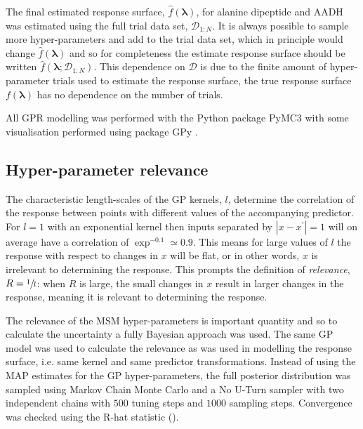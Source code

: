 The final estimated response surface, $\hat{f}(\mathbf{\lambda})$, for alanine dipeptide and AADH was estimated using the full trial data set, $\mathcal{D}_{1:N}$. It is always possible to sample more hyper-parameters and add to the trial data set, which in principle would change $\hat{f}(\mathbf{\lambda})$ and so for completeness the estimate response surface should be written $\hat{f}(\mathbf{\lambda}; \mathcal{D}_{1:N})$. This dependence on $\mathcal{D}$ is due to the finite amount of hyper-parameter trials used to estimate the response surface, the true response surface $f(\mathbf{\lambda})$ has no dependence on the number of trials. 

All GPR modelling was performed with the Python package PyMC3 \cite{salvatierProbabilisticProgrammingPython2016} with some visualisation performed using package GPy \cite{gpy2014}. 

\subsection{Hyper-parameter relevance}
The characteristic length-scales of the GP kernels, $l$, determine the correlation of the response between points with different values of the accompanying predictor. For $l=1$ with an exponential kernel then inputs separated by $|x-x^{\prime}|= 1$ will on average have a correlation of $\exp^{-0.1}\simeq 0.9$. This means for large values of $l$ the response with respect to changes in $x$ will be flat, or in other words, $x$ is irrelevant to determining the response. This prompts the definition of \emph{relevance}, $R = \sfrac{1}{l}$: when $R$ is large, the small changes in $x$ result in larger changes in the response, meaning it is relevant to determining the response. 

The relevance of the MSM hyper-parameters is important quantity and so to calculate the uncertainty a fully Bayesian approach was used. The same GP model was used to calculate the relevance as was used in modelling the response surface, i.e. same kernel and same predictor transformations. Instead of using the MAP estimates for the GP hyper-parameters, the full posterior distribution was sampled using Markov Chain Monte Carlo and a No U-Turn sampler with two independent chains with $500$ tuning steps and $1000$ sampling steps. Convergence was checked using the R-hat statistic (\cite{gelmanBayesianDataAnalysis2014}). 



